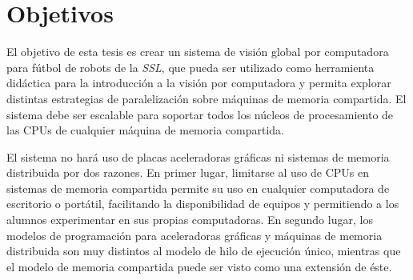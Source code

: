 
\section{Objetivos}

\label{objetivos}

El objetivo de esta tesis es crear un sistema de visión global por computadora
para fútbol de robots de la \emph{SSL}, que pueda ser utilizado como herramienta
didáctica para la introducción a la visión por computadora y permita explorar
distintas estrategias de paralelización sobre máquinas de memoria compartida. El
sistema debe ser escalable para soportar todos los núcleos de procesamiento de
las CPUs de cualquier máquina de memoria compartida.

El sistema no hará uso de placas aceleradoras gráficas ni sistemas de memoria distribuida
por dos razones. En primer lugar, limitarse al uso de CPUs en sistemas de
memoria compartida permite su uso en cualquier computadora de escritorio o
portátil, facilitando la disponibilidad de equipos y permitiendo a los alumnos
experimentar en sus propias computadoras. En segundo lugar, los modelos de
programación para aceleradoras gráficas y máquinas de memoria distribuida son
muy distintos al modelo de hilo de ejecución único, mientras que el modelo de
memoria compartida puede ser visto como una extensión de éste.
